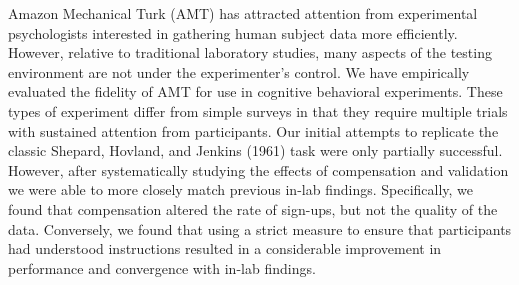 \documentclass[10pt,letterpaper]{article}
\begin{document}
Amazon Mechanical Turk (AMT) has attracted attention from experimental
psychologists interested in gathering human subject data more efficiently.
However, relative to traditional laboratory studies, many aspects of the testing
environment are not under the experimenter's control. We have empirically
evaluated the fidelity of AMT for use in cognitive behavioral experiments. These
types of experiment differ from simple surveys in that they require multiple
trials with sustained attention from participants.  Our initial attempts to
replicate the classic Shepard, Hovland, and Jenkins (1961) task were only
partially successful. However, after systematically studying the effects of
compensation and validation we were able to more closely match previous in-lab
findings. Specifically, we found that compensation altered the rate of sign-ups,
but not the quality of the data. Conversely, we found that using a strict measure
to ensure that participants had understood instructions resulted in a
considerable improvement in performance and convergence with in-lab findings.
\nocite{Shepard:1961wo}






\setlength{\bibleftmargin}{.125in}
\setlength{\bibindent}{-\bibleftmargin}


\end{document}
